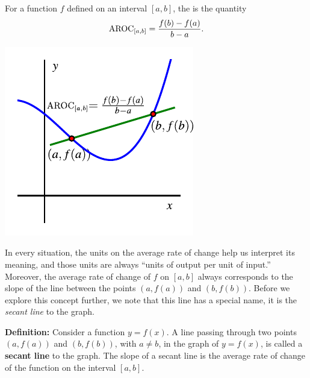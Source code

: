 \documentclass[nooutcomes]{ximera}
\begin{document}
\begin{definition}
For a function $f$ defined on an interval $[a,b]$, the  is the quantity%
\begin{equation*}
\mathrm{AROC}_{[a,b]} = \frac{f(b) - f(a)}{b-a}\text{.}
\end{equation*}

\begin{image}
\includegraphics{aroc-f-x-defn.pdf}
\end{image}

\end{definition}
In every situation, the units on the average rate of change help us interpret its meaning, and those units are always ``units of output per unit of input.''   Moreover, the average rate of change of $f$ on $[a,b]$ always corresponds to the slope of the line between the points $(a,f(a))$ and $(b,f(b))$. Before we explore this concept further, we note that this line has a special name, it is the \textit{secant line} to the graph. 

\begin{callout}
  {\bf Definition:} Consider a function $y=f(x)$. A line passing through two points $(a,f(a))$ and $(b,f(b))$, with $a \neq b$, in the graph of $y=f(x)$, is called a \textbf{secant line} to the graph. The slope of a secant line is the average rate of change of the function on the interval $[a,b]$.
\end{callout}
\end{document}
